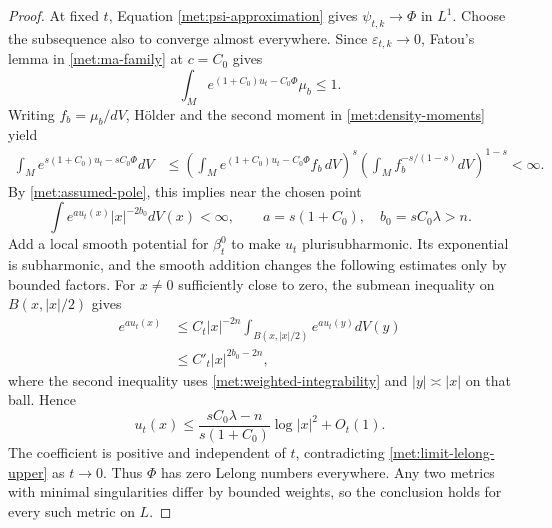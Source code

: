\begin{proof}
At fixed \(t\), Equation \eqref{met:psi-approximation} gives
\(\psi_{t,k}\to\Phi\) in \(L^1\).  Choose the subsequence also to
converge almost everywhere.  Since \(\varepsilon_{t,k}\to0\),
Fatou's lemma in \eqref{met:ma-family} at \(c=C_0\) gives
\begin{equation}
 \label{met:fatou-endpoint}
 \int_M e^{(1+C_0)u_t-C_0\Phi}\mu_b\leq1.
\end{equation}
Writing \(f_b=\mu_b/dV\), H\"older and the second moment in
\eqref{met:density-moments} yield
\begin{align*}
 \int_M e^{s(1+C_0)u_t-sC_0\Phi}dV
 &\leq
 \left(\int_M e^{(1+C_0)u_t-C_0\Phi}f_b\,dV\right)^s
 \left(\int_M f_b^{-s/(1-s)}dV\right)^{1-s}\!<\infty.
\end{align*}
By \eqref{met:assumed-pole}, this implies near the chosen point
\begin{equation}
 \label{met:weighted-integrability}
 \int e^{a u_t(x)}|x|^{-2b_0}dV(x)<\infty,
 \qquad a=s(1+C_0),\quad b_0=sC_0\lambda>n.
\end{equation}
Add a local smooth potential for \(\beta_t^0\) to make \(u_t\)
plurisubharmonic.  Its exponential is subharmonic, and the smooth
addition changes the following estimates only by bounded factors.
For \(x\neq0\) sufficiently close to zero, the submean inequality
on \(B(x,|x|/2)\) gives
\begin{align*}
 e^{a u_t(x)}
 &\leq C_t|x|^{-2n}
       \int_{B(x,|x|/2)} e^{a u_t(y)}dV(y)\\
 &\leq C'_t|x|^{2b_0-2n},
\end{align*}
where the second inequality uses
\eqref{met:weighted-integrability} and \(|y|\asymp|x|\) on that
ball.  Hence
\begin{equation}
 \label{met:lelong-lower}
 u_t(x)\leq
 \frac{sC_0\lambda-n}{s(1+C_0)}\log|x|^2+O_t(1).
\end{equation}
The coefficient is positive and independent of \(t\), contradicting
\eqref{met:limit-lelong-upper} as \(t\to0\).  Thus \(\Phi\) has zero
Lelong numbers everywhere.  Any two metrics with minimal
singularities differ by bounded weights, so the conclusion holds
for every such metric on \(L\).
\end{proof}
